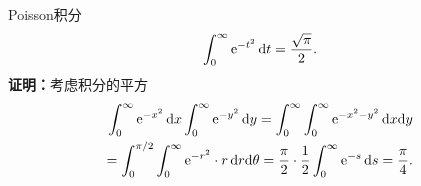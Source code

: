 \begin{example}{Poisson积分}{}
	\begin{equation}\label{eq:calc-gaussian-integral}
		\int_0^\infty\mathop{}\!\mathrm{e}^{-t^2}\mathop{}\!\mathrm{d} t = \frac{\sqrt\pi}2.
	\end{equation}
	\textbf{证明：}考虑积分的平方
	\begin{align*}
		\intRplus\e^{-x^2}\d x\intRplus\e^{-y^2}\d y = \intRplus\intRplus\e^{-x^2-y^2}\d x\nd y \\
		= \int_0^{\pi/2}\intRplus\e^{-r^2} \cdot r\d r\nd\theta = \frac\pi{2} \cdot \frac12\intRplus\e^{-s}\d s = \frac\pi{4}.
	\end{align*}

\end{example}
